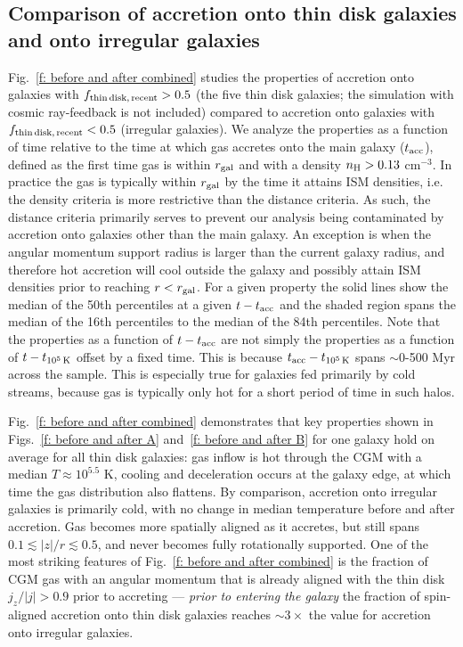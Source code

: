 \documentclass[fleqn,usenatbib]{mnras}
\newcommand{\fthin}{f_{\rm thin\,disk,\,recent}}
\newcommand{\tcools}{t_{10^5\,{\rm K}}}
\newcommand{\tacc}{t_{\rm acc}}
\begin{document}
\subsection{Comparison of accretion onto thin disk galaxies and onto irregular galaxies}
Fig.~\ref{f: before and after combined} studies the properties of accretion onto galaxies with $\fthin > 0.5$ (the five thin disk galaxies; the simulation with cosmic ray-feedback is not included) compared to accretion onto galaxies with $\fthin < 0.5$ (irregular galaxies).
We analyze the properties as a function of time relative to the time at which gas accretes onto the main galaxy ($\tacc$), defined as the first time gas is within $r_{\rm gal}$ and with a density $n_{\rm H} > 0.13$ cm$^{-3}$.
In practice the gas is typically within $r_{\rm gal}$ by the time it attains ISM densities, i.e. the density criteria is more restrictive than the distance criteria.
As such, the distance criteria primarily serves to prevent our analysis being contaminated by accretion onto galaxies other than the main galaxy.
An exception is when the angular momentum support radius is larger than the current galaxy radius, and therefore hot accretion will cool outside the galaxy and possibly attain ISM densities prior to reaching $r < r_{\rm gal}$.
For a given property the solid lines show the median of the 50th percentiles at a given $t - \tacc$ and the shaded region spans the median of the 16th percentiles to the median of the 84th percentiles.
Note that the properties as a function of $t - \tacc$ are not simply the properties as a function of $t - \tcools$ offset by a fixed time.
This is because $\tacc - \tcools$ spans ${\sim}$0-500 Myr across the sample.
This is especially true for galaxies fed primarily by cold streams, because gas is typically only hot for a short period of time in such halos.

Fig.~\ref{f: before and after combined} demonstrates that key properties shown in Figs.~\ref{f: before and after A} and~\ref{f: before and after B} for one galaxy hold on average for all thin disk galaxies:
gas inflow is hot through the CGM with a median $T \approx 10^{5.5}$ K,
cooling and deceleration occurs at the galaxy edge,
at which time the gas distribution also flattens.
By comparison, accretion onto irregular galaxies is primarily cold, with no change in median temperature before and after accretion.
Gas becomes more spatially aligned as it accretes, but still spans $0.1 \lesssim \vert z \vert / r \lesssim 0.5$, and never becomes fully rotationally supported.
One of the most striking features of Fig.~\ref{f: before and after combined} is the fraction of CGM gas with an angular momentum that is already aligned with the thin disk $j_z/\vert j \vert > 0.9$ prior to accreting --- \textit{prior to entering the galaxy} the fraction of spin-aligned accretion onto thin disk galaxies reaches ${\sim} 3 \times$ the value for accretion onto irregular galaxies.
\end{document}
